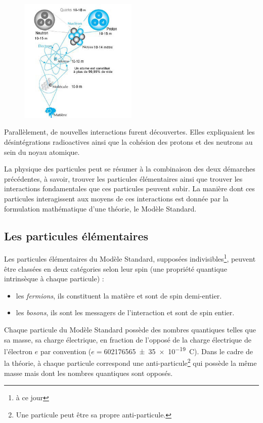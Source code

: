 \vspace*{-0.5cm}
\begin{figure}[ht!]
\centering
\includegraphics[width=0.50\textwidth]{SM/structure.jpg}
\label{structure}
\end{figure}

\vspace*{-0.5cm}
Parallèlement, de nouvelles interactions furent découvertes. Elles expliquaient les désintégrations radioactives ainsi que la cohésion des protons et des neutrons au sein du noyau atomique.

La physique des particules peut se résumer à la combinaison des deux démarches précédentes, à savoir, trouver les particules élémentaires ainsi que trouver les interactions fondamentales que ces particules peuvent subir. La manière dont ces particules interagissent aux moyens de ces interactions est donnée par la formulation mathématique d'une théorie, le Modèle Standard.

\subsection{Les particules élémentaires}
Les particules élémentaires du Modèle Standard, supposées indivisibles\footnote{à ce jour}, peuvent être classées en deux catégories selon leur spin (une propriété quantique intrinsèque à chaque particule) :
\begin{itemize}[label=$\bullet$]
\item les \textit{fermions}, ils constituent la matière et sont de spin demi-entier.
\item les \textit{bosons}, ils sont les messagers de l'interaction et sont de spin entier.
\end{itemize}
Chaque particule du Modèle Standard possède des nombres quantiques telles que sa masse, sa charge électrique, en fraction de l'opposé de la charge électrique de l'électron $e$ par convention ($e=$\SI{602 176 565(35)e-19}{\coulomb}). Dans le cadre de la théorie, à chaque particule correspond une anti-particule\footnote{Une particule peut être sa propre anti-particule.} qui possède la même masse mais dont les nombres quantiques sont opposés.

